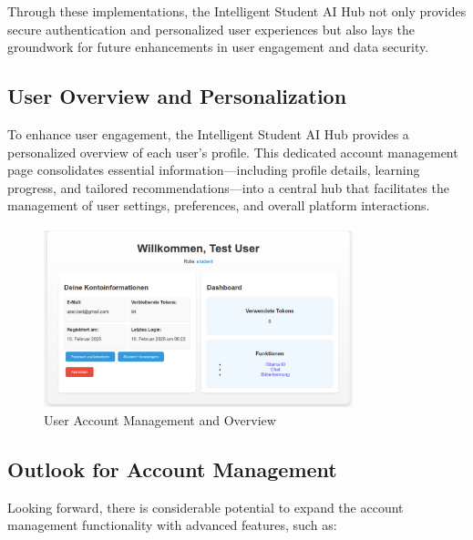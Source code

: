 Through these implementations, the Intelligent Student AI Hub not only provides secure authentication and personalized user experiences but also lays the groundwork for future enhancements in user engagement and data security.

\subsection{User Overview and Personalization}

To enhance user engagement, the Intelligent Student AI Hub provides a personalized overview of each user's profile. This dedicated account management page consolidates essential information—including profile details, learning progress, and tailored recommendations—into a central hub that facilitates the management of user settings, preferences, and overall platform interactions.

\begin{figure}[H]
    \centering
    \includegraphics[width=0.8\textwidth]{figures/Account-Managment.png}
    \caption{User Account Management and Overview}
    \label{fig:user_account_management}
\end{figure}

\subsection{Outlook for Account Management}

Looking forward, there is considerable potential to expand the account management functionality with advanced features, such as:

